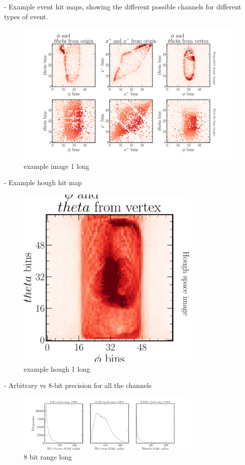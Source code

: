 - Example event hit maps, showing the different possible channels for different types of event.
\begin{figure}
    \includegraphics[width=\textwidth]{diagrams/6-cvn/chipsnet/example_image_1.pdf}
    \caption[example image 1 short]{example image 1 long}
    \label{fig:example_image_1}
\end{figure}
- Example hough hit map
\begin{figure}
    \includegraphics[width=0.8\textwidth]{diagrams/6-cvn/chipsnet/example_hough_1.pdf}
    \caption[example hough 1 short]{example hough 1 long}
    \label{fig:example_hough_1}
\end{figure}
- Arbitrary vs 8-bit precision for all the channels
\begin{figure}
    \includegraphics[width=0.8\textwidth]{diagrams/6-cvn/chipsnet/8_bit_range.pdf}
    \caption[8 bit range short]{8 bit range long}
    \label{fig:8_bit_range}
\end{figure}
